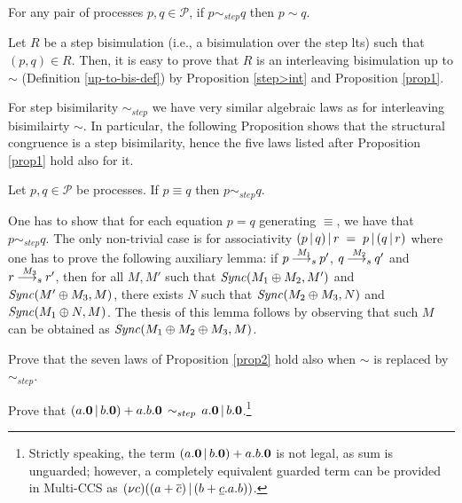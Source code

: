 \begin{proposition}\label{step->int}
For any pair of processes $p, q \in \mathcal{P}$, if $p \sim_{step} q$ then $p \sim q$.

\proof
Let $R$ be a step bisimulation (i.e., a bisimulation over the step lts) such that $(p, q) \in R$.
Then, it is easy to prove that $R$ is an interleaving bisimulation up to $\sim$ (Definition \ref{up-to-bis-def}) by
Proposition \ref{step>int} and Proposition \ref{prop1}. 
\fine
\end{proposition}

For step bisimilarity $\sim_{step}$ we have very similar algebraic laws as for interleaving bisimilairty $\sim$. 
In particular, the following Proposition shows that the structural congruence is a step bisimilarity, hence 
the five laws listed after Proposition \ref{prop1} hold also for it.

\begin{proposition}\label{cong>step}
Let $p, q \in {\mathcal P}$ be processes. If $p \equiv q$ then $p  \sim_{step} q$.

\proof One has to show that for each equation $p = q$ generating $\equiv$, we have that $p  \sim_{step} q$.
The only non-trivial case is for associativity $(p \mbox{$\,|\,$} q) \mbox{$\,|\,$} r \; = \; p \mbox{$\,|\,$} (q \mbox{$\,|\,$} r)$
where one has to prove the following auxiliary lemma: if $p  {\mbox{${\:\stackrel{M_1}{\longrightarrow_s}\:}$}} p'$, $q  {\mbox{${\:\stackrel{M_2}{\longrightarrow_s}\:}$}} q'$
and $r {\mbox{${\:\stackrel{M_3}{\longrightarrow_s}\:}$}} r'$, then for all $M, M'$ such that $\mathit{Sync}(M_1 \oplus M_2, M')$ and $\mathit{Sync}(M' \oplus M_3, M)$,
there exists $N$ such that $\mathit{Sync}(M_2 \oplus M_3, N)$ and $\mathit{Sync}(M_1 \oplus N, M)$. 
The thesis of this lemma follows by observing that such $M$ can be obtained as $\mathit{Sync}(M_1 \oplus M_2 \oplus M_3, M)$.
\fine
\end{proposition}

\begin{exercise}
Prove that the seven laws of Proposition \ref{prop2} hold also when $\sim$ is replaced by $\sim_{step}$.
\fine
\end{exercise}

\begin{exercise}
Prove that $(a.\mbox{\bf 0} \mbox{$\,|\,$} b.\mbox{\bf 0}) + a.b.\mbox{\bf 0} \, \sim_{step} \, a.\mbox{\bf 0} \mbox{$\,|\,$} b.\mbox{\bf 0}$.\footnote{Strictly speaking, the term
$(a.\mbox{\bf 0} \mbox{$\,|\,$} b.\mbox{\bf 0}) + a.b.\mbox{\bf 0}$ is not legal, as sum is unguarded; however, a completely equivalent guarded term
can be provided in Multi-CCS as $\mbox{$({\bf\nu} c)$}((a + \overline{c}) \mbox{$\,|\,$} (b + \underline{c}.a.b))$.}
\fine
\end{exercise}

